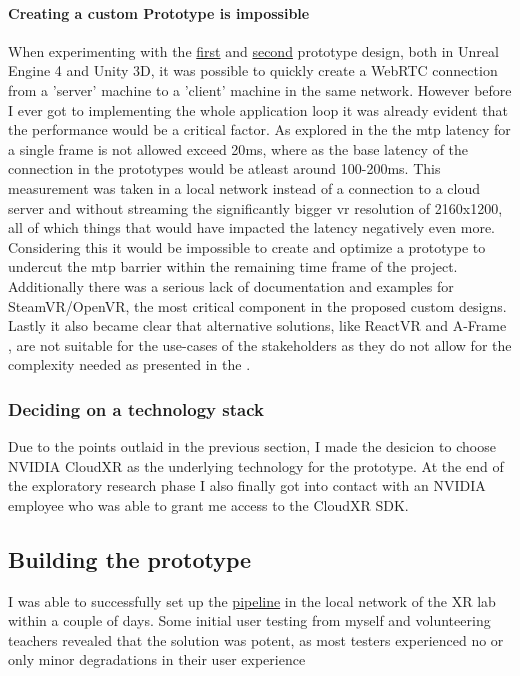 \paragraph{Creating a custom Prototype is impossible}
When experimenting with the \hyperref[fig:pr11]{first} and \hyperref[fig:pr12]{second} prototype design, both in Unreal Engine 4 and Unity 3D, it was possible to quickly create a WebRTC connection from a 'server' machine to a 'client' machine in the same network. However before I ever got to implementing the whole application loop it was already evident that the performance would be a critical factor. As explored in the  the \acrfull{mtp} latency for a single frame is not allowed exceed 20\acrshort{ms}, where as the base latency of the connection in the prototypes would be atleast around 100-200\acrshort{ms}. This measurement was taken in a local network instead of a connection to a cloud server and without streaming the significantly bigger \acrshort{vr} resolution of 2160x1200, all of which things that would have impacted the latency negatively even more. Considering this it would be impossible to create and optimize a prototype to undercut the \acrshort{mtp} barrier within the remaining time frame of the project. Additionally there was a serious lack of documentation and examples for SteamVR/OpenVR, the most critical component in the proposed custom designs. Lastly it also became clear that alternative solutions, like ReactVR \parencite{reactVR} and A-Frame \parencite{aframe}, are not suitable for the use-cases of the stakeholders as they do not allow for the complexity needed as presented in the . \\

\subsubsection{Deciding on a technology stack}
Due to the points outlaid in the previous section, I made the desicion to choose NVIDIA CloudXR as the underlying technology for the prototype. At the end of the exploratory research phase I also finally got into contact with an NVIDIA employee who was able to grant me access to the CloudXR SDK.

\subsection{Building the prototype}
I was able to successfully set up the \hyperref[fig:pr0]{pipeline} in the local network of the XR lab within a couple of days. Some initial user testing from myself and volunteering teachers revealed that the solution was potent, as most testers experienced no or only minor degradations in their user experience

